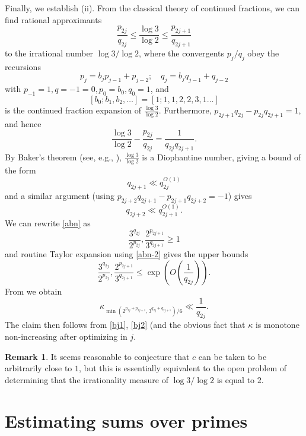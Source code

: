 \documentclass[12pt,a4paper,reqno]{amsart}
\numberwithin{equation}{section}
\theoremstyle{plain}
\theoremstyle{definition}
\newtheorem{remark}[theorem]{Remark}
\begin{document}
Finally, we establish (ii).  From the classical theory of continued fractions, we can find rational approximants
\begin{equation}\label{abn}
 \frac{p_{2j}}{q_{2j}} \leq \frac{\log 3}{\log 2} \leq \frac{p_{2j+1}}{q_{2j+1}}
\end{equation}
to the irrational number $\log 3/\log 2$, where the convergents $p_j/q_j$ obey the recursions
$$ p_j = b_j p_{j-1} + p_{j-2}; \quad q_j = b_j q_{j-1} + q_{j-2}$$
with $p_{-1} = 1, q={-1}=0, p_0 = b_0, q_0=1$, and 
$$[b_0;b_1,b_2,\dots] = [1;1,1,2,2,3,1\dots]$$ 
is the continued fraction expansion of $\frac{\log 3}{\log 2}$.  Furthermore, $p_{2j+1}q_{2j} - p_{2j} q_{2j+1} = 1$, and hence
\begin{equation}\label{abn-2} 
  \frac{\log 3}{\log 2} - \frac{p_{2j}}{q_{2j}} = \frac{1}{q_{2j} q_{2j+1}}.
\end{equation}
By Baker's theorem (see, e.g., \cite{baker-wustholz}), $\frac{\log 3}{\log 2}$ is a Diophantine number, giving a bound of the form
\begin{equation}\label{bj1}
   q_{2j+1} \ll q_{2j}^{O(1)}
\end{equation}
and a similar argument (using $p_{2j+2} q_{2j+1}-p_{2j+1} q_{2j+2} = -1$) gives
\begin{equation}\label{bj2}
 q_{2j+2} \ll q_{2j+1}^{O(1)}.
\end{equation}
We can rewrite \eqref{abn} as
$$ \frac{3^{q_{2j}}}{2^{p_{2j}}}, \frac{2^{p_{2j+1}}}{3^{q_{2j+1}}}\geq 1$$
and routine Taylor expansion using \eqref{abn-2} gives the upper bounds
$$ \frac{3^{q_{2j}}}{2^{p_{2j}}}, \frac{2^{p_{2j+1}}}{3^{q_{2j+1}}}\leq \exp\left( O\left( \frac{1}{q_{2j}}\right)\right).$$
From  we obtain
$$
\kappa_{\min(2^{p_{2j} + p_{2j+1}}, 3^{q_{2j}+q_{2j+1}})/6} \ll \frac{1}{q_{2j}}.$$
The claim then follows from \eqref{bj1}, \eqref{bj2} (and the obvious fact that $\kappa$ is monotone non-increasing after optimizing in $j$.

\begin{remark}
It seems reasonable to conjecture that $c$ can be taken to be arbitrarily close to $1$, but this is essentially equivalent to the open problem of determining that the irrationality measure of $\log 3 / \log 2$ is equal to $2$.
\end{remark}


\section{Estimating sums over primes}\label{primes-sec}
\end{document}
